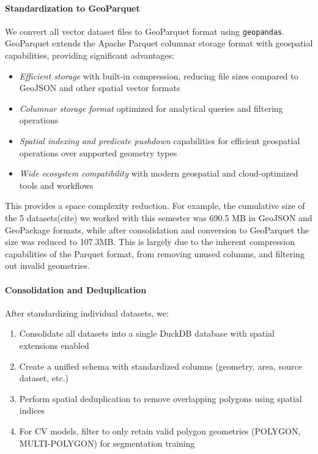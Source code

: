 \paragraph{Standardization to GeoParquet}
We convert all vector dataset files to GeoParquet format using \texttt{geopandas}. GeoParquet extends the Apache Parquet columnar storage format with geospatial capabilities, providing significant advantages:
\begin{itemize}
    \item \textit{Efficient storage} with built-in compression, reducing file sizes compared to GeoJSON and other spatial vector formats
    \item \textit{Columnar storage format} optimized for analytical queries and filtering operations
    \item \textit{Spatial indexing and predicate pushdown} capabilities for efficient geospatial operations over supported geometry types
    \item \textit{Wide ecosystem compatibility} with modern geospatial and cloud-optimized tools and workflows
\end{itemize}

This provides a space complexity reduction. For example, the cumulative size of the 5 datasets(cite) we worked with this semester was 690.5 MB in GeoJSON and GeoPackage formats, 
while after consolidation and conversion to GeoParquet the size was reduced to 107.3MB. This is largely due to the inherent compression capabilities of the Parquet format, from removing unused columns, 
and filtering out invalid geometries. 

\paragraph{Consolidation and Deduplication}
After standardizing individual datasets, we:
\begin{enumerate}
    \item Consolidate all datasets into a single DuckDB database with spatial extensions enabled
    \item Create a unified schema with standardized columns (geometry, area, source dataset, etc.)
    \item Perform spatial deduplication to remove overlapping polygons using spatial indices
    \item For CV models, filter to only retain valid polygon geometries (POLYGON, MULTI-POLYGON) for segmentation training
\end{enumerate}

